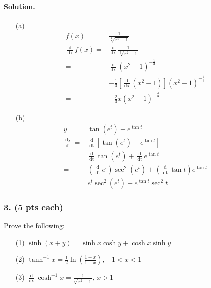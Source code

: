 \paragraph{Solution.}
\begin{itemize}
    \item [(a)]{
    \begin{align*}
		f\left(x\right) =& \frac{1}{\sqrt[3]{x^2-1}}\\
		\frac{\mathop{d}}{\mathop{dx}}f\left(x\right) =& \frac{\mathop{d}}{\mathop{dx}}\frac{1}{\sqrt[3]{x^2-1}}\\
		=& \frac{\mathop{d}}{\mathop{dx}}\left(x^2-1\right)^{-\frac{1}{3}}\\
		=& -\frac{1}{3}\left[\frac{\mathop{d}}{\mathop{dx}}\left(x^2-1\right)\right]\left(x^2-1\right)^{-\frac{4}{3}}\\
		=& -\frac{2}{3}x\left(x^2-1\right)^{-\frac{4}{3}}
	\end{align*}
    }
    \item [(b)] {
    \begin{align*}
		y =& \tan\left(e^t\right) + e^{\tan t}\\
		\frac{\mathop{dy}}{\mathop{dt}} =& \frac{\mathop{d}}{\mathop{dt}}\left[\tan\left(e^t\right) + e^{\tan t}\right]\\
		=& \frac{\mathop{d}}{\mathop{dt}}\tan\left(e^t\right) + \frac{\mathop{d}}{\mathop{dt}}e^{\tan t}\\
		=& \left(\frac{\mathop{d}}{\mathop{dt}}e^t\right)\sec^2\left(e^t\right) + \left(\frac{\mathop{d}}{\mathop{dt}}\tan t\right)e^{\tan t}\\
		=& e^t\sec^2\left(e^t\right) + e^{\tan t}\sec^2 t
	\end{align*}
    }
\end{itemize}

\subsubsection{3. (5 pts each)} Prove the following:
\begin{itemize}
    \item [(1)] $\displaystyle \sinh\left(x + y\right) = \sinh x \cosh y + \cosh x \sinh y$
    \item [(2)] $\displaystyle \tanh^{-1} x = \frac{1}{2} \ln\left(\frac{1 + x}{1 - x}\right)$, $-1 < x < 1$
    \item [(3)] $\displaystyle \frac{\mathop{d}}{\mathop{dx}} \cosh^{-1} x = \frac{1}{\sqrt{x^2-1}}$, $x > 1$
\end{itemize}

